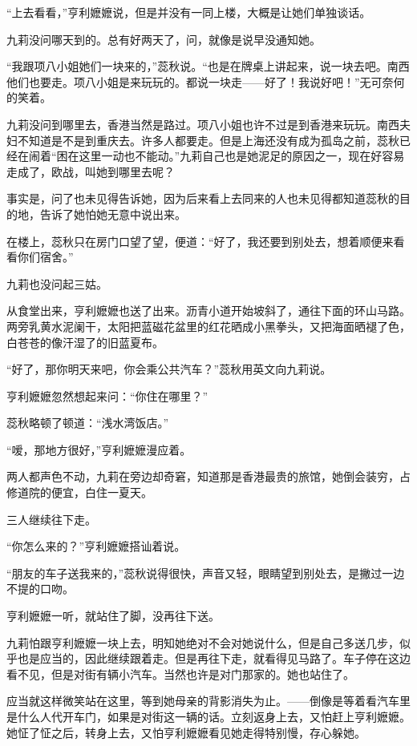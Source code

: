 \par “上去看看，”亨利嬷嬷说，但是并没有一同上楼，大概是让她们单独谈话。
\par 九莉没问哪天到的。总有好两天了，问，就像是说早没通知她。
\par “我跟项八小姐她们一块来的，”蕊秋说。“也是在牌桌上讲起来，说一块去吧。南西他们也要走。项八小姐是来玩玩的。都说一块走——好了！我说好吧！”无可奈何的笑着。
\par 九莉没问到哪里去，香港当然是路过。项八小姐也许不过是到香港来玩玩。南西夫妇不知道是不是到重庆去。许多人都要走。但是上海还没有成为孤岛之前，蕊秋已经在闹着“困在这里一动也不能动。”九莉自己也是她泥足的原因之一，现在好容易走成了，欧战，叫她到哪里去呢？
\par 事实是，问了也未见得告诉她，因为后来看上去同来的人也未见得都知道蕊秋的目的地，告诉了她怕她无意中说出来。
\par 在楼上，蕊秋只在房门口望了望，便道：“好了，我还要到别处去，想着顺便来看看你们宿舍。”
\par 九莉也没问起三姑。
\par 从食堂出来，亨利嬷嬷也送了出来。沥青小道开始坡斜了，通往下面的环山马路。两旁乳黄水泥阑干，太阳把蓝磁花盆里的红花晒成小黑拳头，又把海面晒褪了色，白苍苍的像汗湿了的旧蓝夏布。
\par “好了，那你明天来吧，你会乘公共汽车？”蕊秋用英文向九莉说。
\par 亨利嬷嬷忽然想起来问：“你住在哪里？”
\par 蕊秋略顿了顿道：“浅水湾饭店。”
\par “嗳，那地方很好，”亨利嬷嬷漫应着。
\par 两人都声色不动，九莉在旁边却奇窘，知道那是香港最贵的旅馆，她倒会装穷，占修道院的便宜，白住一夏天。
\par 三人继续往下走。
\par “你怎么来的？”亨利嬷嬷搭讪着说。
\par “朋友的车子送我来的，”蕊秋说得很快，声音又轻，眼睛望到别处去，是撇过一边不提的口吻。
\par 亨利嬷嬷一听，就站住了脚，没再往下送。
\par 九莉怕跟亨利嬷嬷一块上去，明知她绝对不会对她说什么，但是自己多送几步，似乎也是应当的，因此继续跟着走。但是再往下走，就看得见马路了。车子停在这边看不见，但是对街有辆小汽车。当然也许是对门那家的。她也站住了。
\par 应当就这样微笑站在这里，等到她母亲的背影消失为止。——倒像是等着看汽车里是什么人代开车门，如果是对街这一辆的话。立刻返身上去，又怕赶上亨利嬷嬷。她怔了怔之后，转身上去，又怕亨利嬷嬷看见她走得特别慢，存心躲她。
